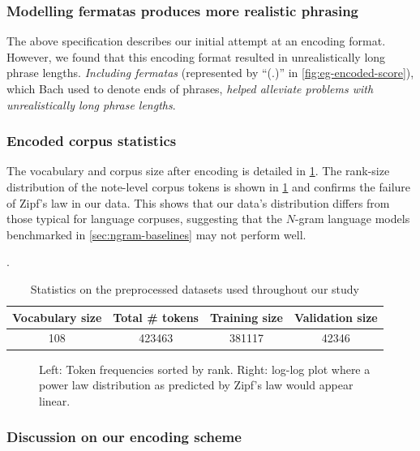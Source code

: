 \subsubsection{Modelling fermatas produces more realistic phrasing}

The above specification describes our initial attempt at an encoding format.
However, we found that this encoding format resulted in unrealistically long
phrase lengths. \emph{Including fermatas} (represented by ``(.)'' in
\vref{fig:eg-encoded-score}), which Bach used to denote ends of phrases,
\emph{helped alleviate problems with unrealistically long phrase lengths}.

\subsubsection{Encoded corpus statistics}

The vocabulary and corpus size after encoding is detailed in
\cref{tab:encoded-corpus-stats}. The rank-size distribution of the note-level
corpus tokens is shown in \cref{fig:zipf} and confirms the failure of Zipf's
law in our data. This shows that our data's distribution differs from those
typical for language corpuses, suggesting that the $N$-gram language models
benchmarked in \vref{sec:ngram-baselines} may not perform well.

\begin{table}[tb]
  \centering
  \caption{Statistics on the preprocessed datasets used throughout our study}
  \label{tab:encoded-corpus-stats}.
  \begin{tabular}{c c c c}
    \toprule
    Vocabulary size & Total \# tokens & Training size & Validation size \\
    \midrule
    108 & 423463 & 381117 & 42346 \\
    \bottomrule
  \end{tabular}
\end{table}

\begin{figure}[tb]
  \centering
  
  \caption{Left: Token frequencies sorted by rank. Right: log-log plot where
  a power law distribution as predicted by Zipf's law would appear linear.}
  \label{fig:zipf}
\end{figure}

\subsubsection{Discussion on our encoding scheme}

